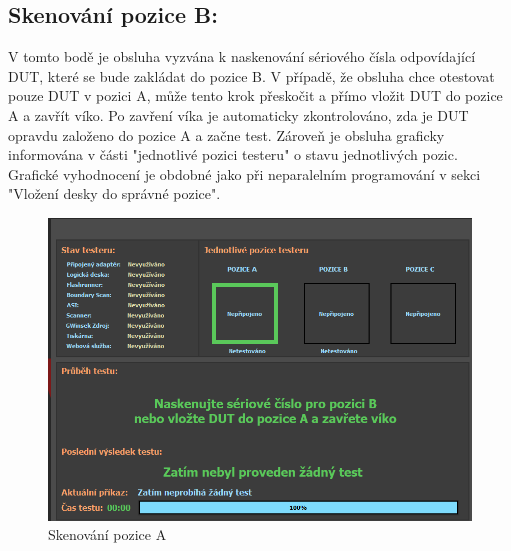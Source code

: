 \subsection{Skenování pozice B:}
	V tomto bodě je obsluha vyzvána k naskenování sériového čísla odpovídající DUT, které se bude zakládat do pozice B. V případě,
	že obsluha chce otestovat pouze DUT v pozici A, může tento krok přeskočit a přímo vložit DUT do pozice A a zavřít víko.
	Po zavření víka je automaticky zkontrolováno, zda je DUT opravdu založeno do pozice A a začne test.
    Zároveň je obsluha graficky informována v části "jednotlivé pozici testeru"
    o stavu jednotlivých pozic. Grafické vyhodnocení je obdobné jako při neparalelním programování
    v sekci "Vložení desky do správné pozice".
	\begin{figure}[ht!]
		\centering
		\includegraphics[height = 0.22\textheight]{obrazky/dual_SCAN_B.PNG}
        \caption{Skenování pozice A}
	\end{figure}


